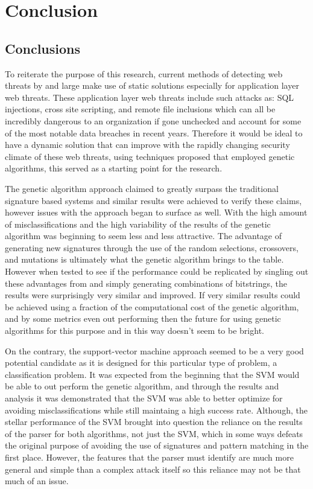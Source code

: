 \chapter{Conclusion}

\section{Conclusions}

To reiterate the purpose of this research, current methods of detecting web threats by and large make use of static solutions especially for application layer web threats.  These application layer web threats include such attacks as: SQL injections, cross site scripting, and remote file inclusions which can all be incredibly dangerous to an organization if gone unchecked and account for some of the most notable data breaches in recent years.  Therefore it would be ideal to have a dynamic solution that can improve with the rapidly changing security climate of these web threats, using techniques proposed that employed genetic algorithms, this served as a starting point for the research.  

The genetic algorithm approach claimed to greatly surpass the traditional signature based systems and similar results were achieved to verify these claims, however issues with the approach began to surface as well.  With the high amount of misclassifications and the high variability of the results of the genetic algorithm was beginning to seem less and less attractive.  The advantage of generating new signatures through the use of the random selections, crossovers, and mutations is ultimately what the genetic algorithm brings to the table.  However when tested to see if the performance could be replicated by singling out these advantages from and simply generating combinations of bitstrings, the results were surprisingly very similar and improved.  If very similar results could be achieved using a fraction of the computational cost of the genetic algorithm, and by some metrics even out performing then the future for using genetic algorithms for this purpose and in this way doesn't seem to be bright.

On the contrary, the support-vector machine approach seemed to be a very good potential candidate as it is designed for this particular type of problem, a classification problem.  It was expected from the beginning that the SVM would be able to out perform the genetic algorithm, and through the results and analysis it was demonstrated that the SVM was able to better optimize for avoiding misclassifications while still maintaing a high success rate.  Although, the stellar performance of the SVM brought into question the reliance on the results of the parser for both algorithms, not just the SVM, which in some ways defeats the original purpose of avoiding the use of signatures and pattern matching in the first place.  However, the features that the parser must identify are much more general and simple than a complex attack itself so this reliance may not be that much of an issue.

